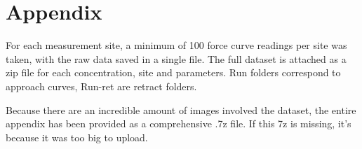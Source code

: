\chapter{Appendix}

For each measurement site, a minimum of 100 force curve readings per site was taken, with the raw data saved in a single file. The full dataset is attached as a zip file for each concentration, site and parameters. Run folders correspond to approach curves, Run-ret are retract folders.

Because there are an incredible amount of images involved the dataset, the entire appendix has been provided as a comprehensive .7z file. If this 7z is missing, it's because it was too big to upload.
